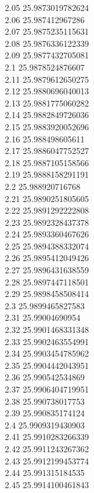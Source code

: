 {2.05	25.9873019782624\\
2.06	25.987412967286\\
2.07	25.9875235115631\\
2.08	25.9876336122339\\
2.09	25.9877432705081\\
2.1	25.9878524876607\\
2.11	25.9879612650275\\
2.12	25.9880696040013\\
2.13	25.9881775060282\\
2.14	25.9882849726036\\
2.15	25.9883920052696\\
2.16	25.988498605611\\
2.17	25.9886047752527\\
2.18	25.9887105158566\\
2.19	25.9888158291191\\
2.2	25.988920716768\\
2.21	25.9890251805605\\
2.22	25.9891292222808\\
2.23	25.9892328437378\\
2.24	25.9893360467626\\
2.25	25.9894388332074\\
2.26	25.9895412049426\\
2.27	25.9896431638559\\
2.28	25.9897447118501\\
2.29	25.9898458508414\\
2.3	25.9899465827583\\
2.31	25.99004690954\\
2.32	25.9901468331348\\
2.33	25.9902463554991\\
2.34	25.9903454785962\\
2.35	25.9904442043951\\
2.36	25.990542534869\\
2.37	25.9906404719951\\
2.38	25.990738017753\\
2.39	25.990835174124\\
2.4	25.9909319430903\\
2.41	25.9910283266339\\
2.42	25.9911243267362\\
2.43	25.9912199453774\\
2.44	25.991315184535\\
2.45	25.9914100461843\\
}
